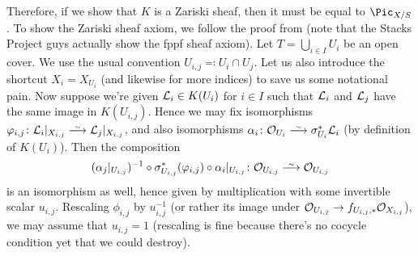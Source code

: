 \documentclass[a4paper,parskip=half,numbers=enddot, DIV=12]{scrreprt}
\begin{document}
\begin{example}
	Therefore, if we show that $K$ is a Zariski sheaf, then it must be equal to $\Pic_{X/S}$. To show the Zariski sheaf axiom, we follow the proof from \cite[]{stacks-project} (note that the Stacks Project guys actually show the fppf sheaf axiom). Let $T=\bigcup_{i\in I}U_i$ be an open cover. We use the usual convention $U_{i,j}\eqqcolon U_i\cap U_j$. Let us also introduce the shortcut $X_i=X_{U_i}$ (and likewise for more indices) to save us some notational pain. Now suppose we're given $\mathcal{L}_i\in K(U_i)$ for $i\in I$ such that $\mathcal{L}_i$ and $\mathcal{L}_j$ have the same image in $K(U_{i,j})$. Hence we may fix isomorphisms $\phi_{i,j}\colon \Ll_i|_{X_{i,j}}\isomorphism\Ll_j|_{X_{i,j}}$, and also isomorphisms $\alpha_i\colon \Oo_{U_i}\isomorphism \sigma_{U_i}^*\Ll_i$ (by definition of $K(U_i)$). Then the composition
	\begin{align*}
		(\alpha_j|_{U_{i,j}})^{-1}\circ\sigma_{U_{i,j}}^*(\phi_{i,j})\circ\alpha_i|_{U_{i,j}}\colon \Oo_{U_{i,j}}\isomorphism \Oo_{U_{i,j}}
	\end{align*}
	is an isomorphism as well, hence given by multiplication with some invertible scalar $u_{i,j}$. Rescaling $\phi_{i,j}$ by $u_{i,j}^{-1}$ (or rather its image under $\Oo_{U_{i,j}}\morphism f_{U_{i,j},*}\Oo_{X_{i,j}}$), we may assume that $u_{i,j}=1$ (rescaling is fine because there's no cocycle condition yet that we could destroy).
	

\end{example}
\end{document}
